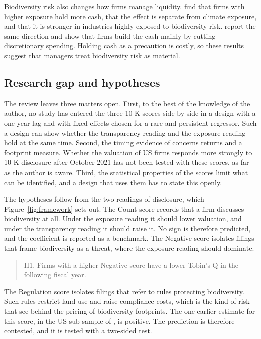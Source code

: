 \documentclass[12pt,a4paper]{article}
\begin{document}
Biodiversity risk also changes how firms manage liquidity. \citet{ahmad2024} find that firms with higher exposure hold more cash, that the effect is separate from climate exposure, and that it is stronger in industries highly exposed to biodiversity risk. \citet{wang2026} report the same direction and show that firms build the cash mainly by cutting discretionary spending. Holding cash as a precaution is costly, so these results suggest that managers treat biodiversity risk as material.

\subsection{Research gap and hypotheses}

The review leaves three matters open. First, to the best of the knowledge of the author, no study has entered the three 10-K scores side by side in a design with a one-year lag and with fixed effects chosen for a rare and persistent regressor. Such a design can show whether the transparency reading and the exposure reading hold at the same time. Second, the timing evidence of \citet{garel2024} concerns returns and a footprint measure. Whether the valuation of US firms responds more strongly to 10-K disclosure after October 2021 has not been tested with these scores, as far as the author is aware. Third, the statistical properties of the scores limit what can be identified, and a design that uses them has to state this openly.

The hypotheses follow from the two readings of disclosure, which Figure~\ref{fig:framework} sets out. The Count score records that a firm discusses biodiversity at all. Under the exposure reading it should lower valuation, and under the transparency reading it should raise it. No sign is therefore predicted, and the coefficient is reported as a benchmark. The Negative score isolates filings that frame biodiversity as a threat, where the exposure reading should dominate.

\begin{quote}
H1. Firms with a higher Negative score have a lower Tobin's Q in the following fiscal year.
\end{quote}

The Regulation score isolates filings that refer to rules protecting biodiversity. Such rules restrict land use and raise compliance costs, which is the kind of risk that \citet{garel2024} see behind the pricing of biodiversity footprints. The one earlier estimate for this score, in the US sub-sample of \citet{cosma2025}, is positive. The prediction is therefore contested, and it is tested with a two-sided test.
\end{document}
